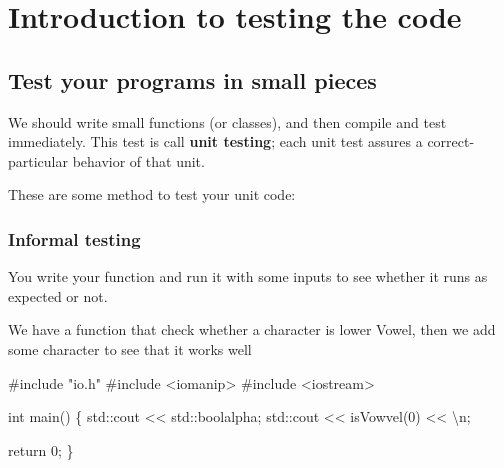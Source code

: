 \documentclass[
  letterpaper,
  DIV=11,
  numbers=noendperiod]{scrreprt}
\newenvironment{Shaded}{\begin{snugshade}}{\end{snugshade}}
\newcommand{\CommentTok}[1]{\textcolor[rgb]{0.37,0.37,0.37}{#1}}
\newcommand{\DecValTok}[1]{\textcolor[rgb]{0.68,0.00,0.00}{#1}}
\newcommand{\ErrorTok}[1]{\textcolor[rgb]{0.68,0.00,0.00}{#1}}
\newcommand{\FunctionTok}[1]{\textcolor[rgb]{0.28,0.35,0.67}{#1}}
\newcommand{\NormalTok}[1]{\textcolor[rgb]{0.00,0.23,0.31}{#1}}
\newcommand{\SpecialCharTok}[1]{\textcolor[rgb]{0.37,0.37,0.37}{#1}}
\newcommand{\StringTok}[1]{\textcolor[rgb]{0.13,0.47,0.30}{#1}}
\begin{document}
\hypertarget{introduction-to-testing-the-code}{%
\section{Introduction to testing the
code}\label{introduction-to-testing-the-code}}

\hypertarget{test-your-programs-in-small-pieces}{%
\subsection{Test your programs in small
pieces}\label{test-your-programs-in-small-pieces}}

We should write small functions (or classes), and then compile and test
immediately. This test is call \textbf{unit testing}; each unit test
assures a correct-particular behavior of that unit.

These are some method to test your unit code:

\hypertarget{informal-testing}{%
\subsubsection{Informal testing}\label{informal-testing}}

You write your function and run it with some inputs to see whether it
runs as expected or not.

We have a function that check whether a character is lower Vowel, then
we add some character to see that it works well

\begin{Shaded}
\begin{Highlighting}[]
\CommentTok{\#include "io.h"}
\CommentTok{\#include \textless{}iomanip\textgreater{}}
\CommentTok{\#include \textless{}iostream\textgreater{}}

\NormalTok{int }\FunctionTok{main}\NormalTok{()}
\NormalTok{\{}
\NormalTok{    std}\SpecialCharTok{::}\NormalTok{cout }\SpecialCharTok{\textless{}}\ErrorTok{\textless{}}\NormalTok{ std}\SpecialCharTok{::}\NormalTok{boolalpha;}
\NormalTok{    std}\SpecialCharTok{::}\NormalTok{cout }\SpecialCharTok{\textless{}}\ErrorTok{\textless{}} \FunctionTok{isVowvel}\NormalTok{(}\StringTok{\textquotesingle{}0\textquotesingle{}}\NormalTok{) }\SpecialCharTok{\textless{}}\ErrorTok{\textless{}} \StringTok{\textquotesingle{}}\SpecialCharTok{\textbackslash{}n}\StringTok{\textquotesingle{}}\NormalTok{;}

\NormalTok{    return }\DecValTok{0}\NormalTok{;}
\NormalTok{\}}
\end{Highlighting}
\end{Shaded}
\end{document}
